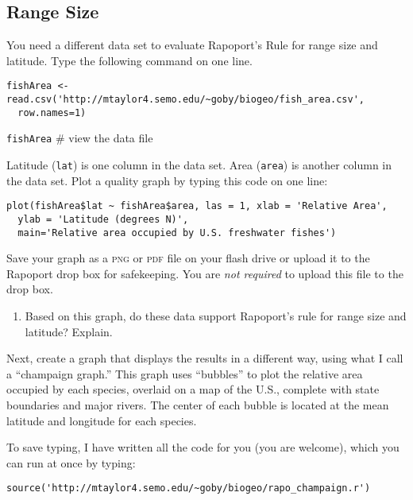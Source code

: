 \documentclass[11pt]{article}
\begin{document}
\subsection*{Range Size}

You need a different data set to evaluate Rapoport's Rule for range 
size and latitude. Type the following command on one line.

\begin{verbatim}
fishArea <- read.csv('http://mtaylor4.semo.edu/~goby/biogeo/fish_area.csv',
  row.names=1)
\end{verbatim}

\texttt{fishArea} \qquad \# view the data file

Latitude (\texttt{lat}) is one column in the data set. Area
(\texttt{area}) is another column in the data set. Plot a quality
graph by typing this code on one line:

\begin{verbatim}
plot(fishArea$lat ~ fishArea$area, las = 1, xlab = 'Relative Area',
  ylab = 'Latitude (degrees N)',
  main='Relative area occupied by U.S. freshwater fishes')
\end{verbatim}

Save your graph as a \textsc{png} or \textsc{pdf} file on your flash 
drive or upload it to the Rapoport drop box for safekeeping. You are 
\emph{not required} to upload this file to the drop box.

\begin{enumerate}[resume]
	\item Based on this graph, do these data support Rapoport's rule 
	for range size and latitude? Explain.

	\vspace{8\baselineskip}

\end{enumerate}

Next, create a graph that displays the results in a different way, 
using what I call a “champaign graph.” This graph uses ``bubbles'' to 
plot the relative area occupied by each species, overlaid on a map of 
the U.S., complete with state boundaries and major rivers.  The center 
of each bubble is located at the mean latitude and longitude for each 
species.

To save typing, I have written all the code for you (you are welcome), 
which you can run at once by typing:

\begin{verbatim}
source('http://mtaylor4.semo.edu/~goby/biogeo/rapo_champaign.r')
\end{verbatim}
\end{document}
